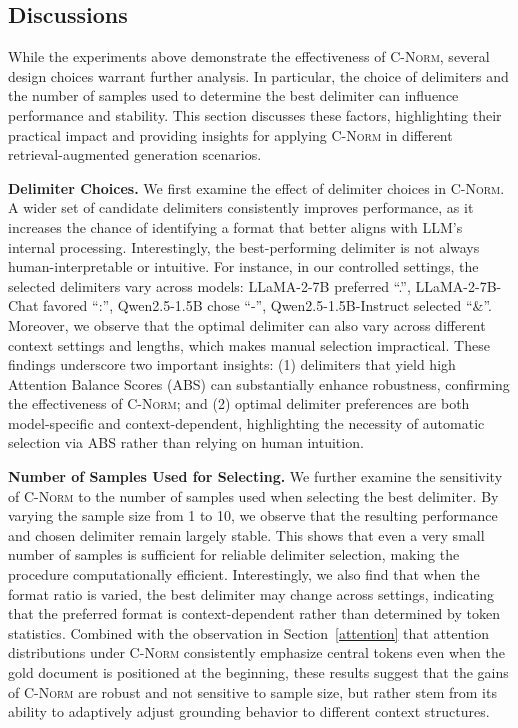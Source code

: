 \documentclass{article} %
\newcommand{\cnorm}{\textsc{C-Norm}}
\newcommand{\llama}{LLaMA-2-7B}
\newcommand{\llamachat}{LLaMA-2-7B-Chat}
\newcommand{\qwen}{Qwen2.5-1.5B}
\newcommand{\qwenchat}{Qwen2.5-1.5B-Instruct}
\begin{document}
\subsection{Discussions}
While the experiments above demonstrate the effectiveness of \cnorm{}, several design choices warrant further analysis. In particular, the choice of delimiters and the number of samples used to determine the best delimiter can influence performance and stability. This section discusses these factors, highlighting their practical impact and providing insights for applying \cnorm{} in different retrieval-augmented generation scenarios.

\textbf{Delimiter Choices.}
We first examine the effect of delimiter choices in \cnorm{}. A wider set of candidate delimiters consistently improves performance, as it increases the chance of identifying a format that better aligns with LLM’s internal processing. Interestingly, the best-performing delimiter is not always human-interpretable or intuitive. For instance, in our controlled settings, the selected delimiters vary across models: \llama{} preferred ``.'', \llamachat{} favored ``:'', \qwen{} chose ``-'', \qwenchat{} selected ``\&''. Moreover, we observe that the optimal delimiter can also vary across different context settings and lengths, which makes manual selection impractical. These findings underscore two important insights: (1) delimiters that yield high Attention Balance Scores (ABS) can substantially enhance robustness, confirming the effectiveness of \cnorm{}; and (2) optimal delimiter preferences are both model-specific and context-dependent, highlighting the necessity of automatic selection via ABS rather than relying on human intuition.

\textbf{Number of Samples Used for Selecting.}
We further examine the sensitivity of \cnorm{} to the number of samples used when selecting the best delimiter. By varying the sample size from 1 to 10, we observe that the resulting performance and chosen delimiter remain largely stable. This shows that even a very small number of samples is sufficient for reliable delimiter selection, making the procedure computationally efficient. Interestingly, we also find that when the format ratio is varied, the best delimiter may change across settings, indicating that the preferred format is context-dependent rather than determined by token statistics. Combined with the observation in Section~\ref{attention} that attention distributions under \cnorm{} consistently emphasize central tokens even when the gold document is positioned at the beginning, these results suggest that the gains of \cnorm{} are robust and not sensitive to sample size, but rather stem from its ability to adaptively adjust grounding behavior to different context structures.
\end{document}

